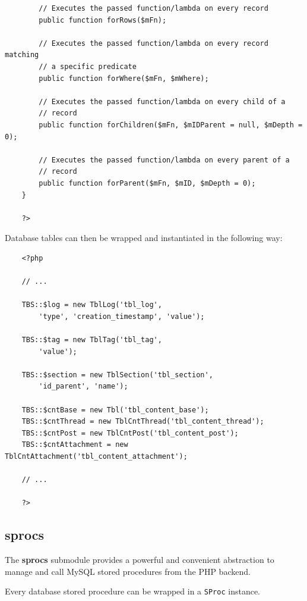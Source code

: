 \documentclass[12pt]{report}
\renewcommand\emph{\textbf}
\begin{document}
\begin{verbatim}
        // Executes the passed function/lambda on every record
        public function forRows($mFn);

        // Executes the passed function/lambda on every record matching
        // a specific predicate
        public function forWhere($mFn, $mWhere);

        // Executes the passed function/lambda on every child of a
        // record
        public function forChildren($mFn, $mIDParent = null, $mDepth = 0);

        // Executes the passed function/lambda on every parent of a
        // record
        public function forParent($mFn, $mID, $mDepth = 0);
    }

    ?>
                    \end{verbatim}                

                    Database tables can then be wrapped and instantiated in the following way:

                    \begin{verbatim}
    <?php

    // ...

    TBS::$log = new TblLog('tbl_log',
        'type', 'creation_timestamp', 'value');

    TBS::$tag = new TblTag('tbl_tag',
        'value');

    TBS::$section = new TblSection('tbl_section',
        'id_parent', 'name');

    TBS::$cntBase = new Tbl('tbl_content_base');
    TBS::$cntThread = new TblCntThread('tbl_content_thread');
    TBS::$cntPost = new TblCntPost('tbl_content_post');
    TBS::$cntAttachment = new TblCntAttachment('tbl_content_attachment');

    // ...

    ?>
                    \end{verbatim}              
                
                \subsection{sprocs}

                    The \emph{sprocs} submodule provides a powerful and convenient abstraction to manage and call MySQL stored procedures from the PHP backend.

                    Every database stored procedure can be wrapped in a \texttt{SProc} instance.
\end{document}

